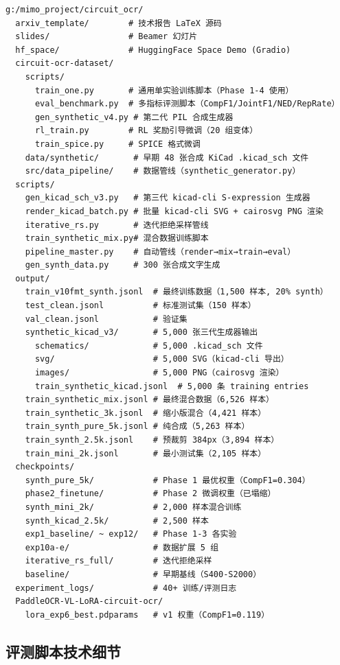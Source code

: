 \begin{verbatim}
g:/mimo_project/circuit_ocr/
  arxiv_template/        # 技术报告 LaTeX 源码
  slides/                # Beamer 幻灯片
  hf_space/              # HuggingFace Space Demo (Gradio)
  circuit-ocr-dataset/
    scripts/
      train_one.py       # 通用单实验训练脚本（Phase 1-4 使用）
      eval_benchmark.py  # 多指标评测脚本（CompF1/JointF1/NED/RepRate）
      gen_synthetic_v4.py # 第二代 PIL 合成生成器
      rl_train.py        # RL 奖励引导微调（20 组变体）
      train_spice.py     # SPICE 格式微调
    data/synthetic/       # 早期 48 张合成 KiCad .kicad_sch 文件
    src/data_pipeline/    # 数据管线（synthetic_generator.py）
  scripts/
    gen_kicad_sch_v3.py   # 第三代 kicad-cli S-expression 生成器
    render_kicad_batch.py # 批量 kicad-cli SVG + cairosvg PNG 渲染
    iterative_rs.py       # 迭代拒绝采样管线
    train_synthetic_mix.py# 混合数据训练脚本
    pipeline_master.py    # 自动管线（render→mix→train→eval）
    gen_synth_data.py     # 300 张合成文字生成
  output/
    train_v10fmt_synth.jsonl  # 最终训练数据（1,500 样本, 20% synth）
    test_clean.jsonl          # 标准测试集（150 样本）
    val_clean.jsonl           # 验证集
    synthetic_kicad_v3/       # 5,000 张三代生成器输出
      schematics/             # 5,000 .kicad_sch 文件
      svg/                    # 5,000 SVG（kicad-cli 导出）
      images/                 # 5,000 PNG（cairosvg 渲染）
      train_synthetic_kicad.jsonl  # 5,000 条 training entries
    train_synthetic_mix.jsonl # 最终混合数据（6,526 样本）
    train_synthetic_3k.jsonl  # 缩小版混合（4,421 样本）
    train_synth_pure_5k.jsonl # 纯合成（5,263 样本）
    train_synth_2.5k.jsonl    # 预裁剪 384px（3,894 样本）
    train_mini_2k.jsonl       # 最小测试集（2,105 样本）
  checkpoints/
    synth_pure_5k/            # Phase 1 最优权重（CompF1=0.304）
    phase2_finetune/          # Phase 2 微调权重（已塌缩）
    synth_mini_2k/            # 2,000 样本混合训练
    synth_kicad_2.5k/         # 2,500 样本
    exp1_baseline/ ~ exp12/   # Phase 1-3 各实验
    exp10a-e/                 # 数据扩展 5 组
    iterative_rs_full/        # 迭代拒绝采样
    baseline/                 # 早期基线（S400-S2000）
  experiment_logs/            # 40+ 训练/评测日志
  PaddleOCR-VL-LoRA-circuit-ocr/
    lora_exp6_best.pdparams   # v1 权重（CompF1=0.119）
\end{verbatim}

\subsection{评测脚本技术细节}

